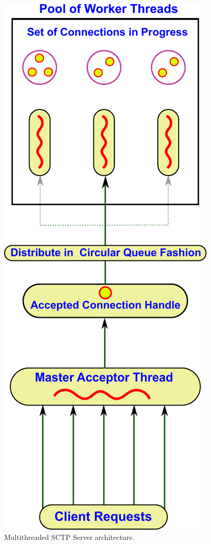 \documentclass[hidelinks]{report}
\begin{document}
\begin{figure}[h]

\centering
\includegraphics[scale=0.5]{sctp_arc}
\caption{Multithreaded SCTP Server architecture.}
\label{sctp_arc}

\end{figure}
\end{document}
